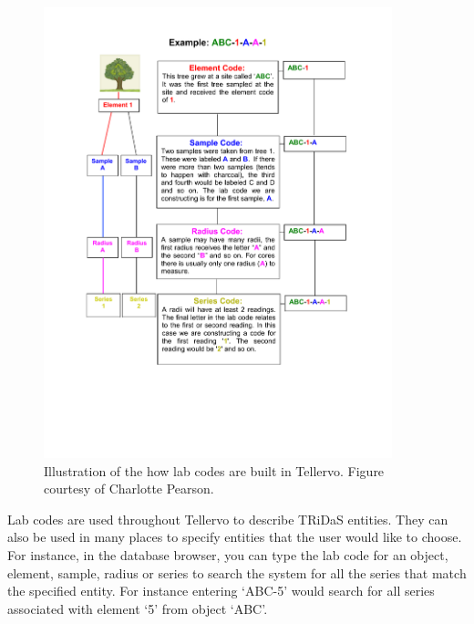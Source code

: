 \begin{figure}
\centering
\includegraphics[trim = 1in 1.5in 1in 0.5in, clip, width=0.9\textwidth]{Images/CorinaSampleCodes.pdf}
\caption{Illustration of the how lab codes are built in Tellervo.  Figure courtesy of Charlotte Pearson.} 
\label{fig:labcodes}
\end{figure}

Lab codes are used throughout Tellervo to describe TRiDaS entities.  They can also be used in many places to specify entities that the user would like to choose.  For instance, in the database browser, you can type the lab code for an object, element, sample, radius or series to search the system for all the series that match the specified entity.  For instance entering `ABC-5' would search for all series associated with element `5' from object `ABC'.






